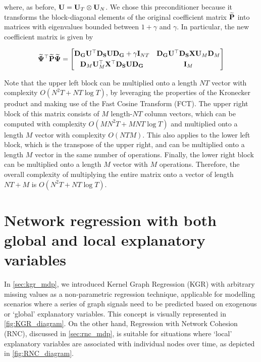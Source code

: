 where, as before, $\mathbf{U} = \mathbf{U}_T \otimes \mathbf{U}_N $. We chose this preconditioner because it transforms the block-diagonal elements of the original coefficient matrix $\widetilde{\mathbf{P}}$ into matrices with eigenvalues bounded between $1 + \gamma$ and $\gamma$. In particular, the new coefficient matrix is given by

\begin{equation*}
    \widetilde{\mathbf{\Psi}}^\top \widetilde{\mathbf{P}}  \widetilde{\mathbf{\Psi}} = 
       \begin{bmatrix}
        \mathbf{D}_{\mathbf{G}} \mathbf{U}^\top \mathbf{D}_{\mathbf{S}} \mathbf{U} \mathbf{D}_{\mathbf{G}} + \gamma \mathbf{I}_{NT}  &  \mathbf{D}_{\mathbf{G}} \mathbf{U}^\top \mathbf{D}_{\mathbf{S}} \mathbf{X} \mathbf{U}_M \mathbf{D}_M \\[0.1cm] 
        \mathbf{D}_M \mathbf{U}_M^\top \mathbf{X}^\top \mathbf{D}_{\mathbf{S}} \mathbf{U} \mathbf{D}_{\mathbf{G}} & \mathbf{I}_M
        \end{bmatrix}
\end{equation*}

Note that the upper left block can be multiplied onto a length $NT$ vector with complexity $O(N^2T + NT \log T)$, by leveraging the properties of the Kronecker product and making use of the Fast Cosine Transform (FCT). The upper right block of this matrix consists of $M$ length-$NT$ column vectors, which can be computed with complexity $O(MN^2T + MNT \log T)$ and multiplied onto a length $M$ vector with complexity $O(NTM)$. This also applies to the lower left block, which is the transpose of the upper right, and can be multiplied onto a length $M$ vector in the same number of operations. Finally, the lower right block can be multiplied onto a length $M$ vector with $M$ operations. Therefore, the overall complexity of multiplying the entire matrix onto a vector of length $NT + M$ is $O(N^2T + NT \log T)$. 



\section{Network regression with both global and local explanatory variables}

\label{sec:kgrnc}

In \cref{sec:kgr_mdp}, we introduced Kernel Graph Regression (KGR) with arbitrary missing values as a non-parametric regression technique, applicable for modelling scenarios where a series of graph signals need to be predicted based on exogenous or `global' explanatory variables. This concept is visually represented in \cref{fig:KGR_diagram}. On the other hand, Regression with Network Cohesion (RNC), discussed in \cref{sec:rnc_mdp}, is suitable for situations where `local' explanatory variables are associated with individual nodes over time, as depicted in \cref{fig:RNC_diagram}.

